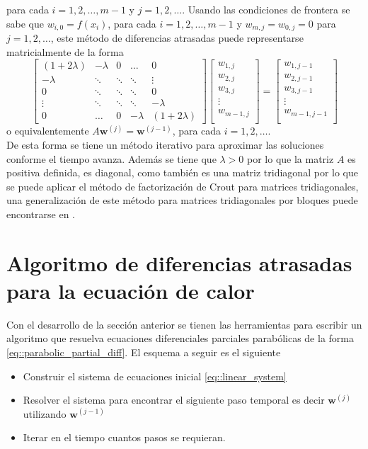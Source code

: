 \documentclass[a4paper]{article}
\begin{document}
para cada $i=1,2,\hdots,m-1$ y $j=1,2,\hdots$. Usando las condiciones de frontera se sabe que $w_{i,0}=f(x_i)$, para cada  
$i=1,2,\hdots,m-1$ y $w_{m,j}=w_{0,j}=0$ para $j=1,2,\hdots$, este método de diferencias atrasadas puede representarse matricialmente de la forma
\begin{equation}\label{eq::linear_system}
\begin{bmatrix}
(1+2\lambda) & -\lambda & 0 &\dots&0 \\
-\lambda     &\ddots    & \ddots& \ddots&\vdots\\
0&\ddots&\ddots&\ddots&0\\
\vdots&\ddots&\ddots&\ddots&-\lambda\\
0&\dots&0&-\lambda&(1+2\lambda)
\end{bmatrix}
\begin{bmatrix}
w_{1,j}\\
w_{2,j}\\
w_{3,j}\\
\vdots\\
w_{m-1,j}\\
\end{bmatrix}=
\begin{bmatrix}
w_{1,j-1}\\
w_{2,j-1}\\
w_{3,j-1}\\
\vdots\\
w_{m-1,j-1}\\
\end{bmatrix}
\end{equation}
o equivalentemente $A\mathbf{w}^{(j)}=\mathbf{w}^{(j-1)}$, para cada $i=1,2,\hdots$.\\
De esta forma se tiene un método iterativo para aproximar las soluciones conforme el tiempo avanza. Además se tiene que $\lambda>0$ por lo que la matriz $A$ es positiva definida, es diagonal, como también es una matriz tridiagonal por lo que se puede aplicar el método de factorización de Crout para matrices tridiagonales, una generalización de este método para matrices tridiagonales por bloques puede encontrarse en \cite{Medina}.

\section{Algoritmo de diferencias atrasadas para la ecuación de calor}
Con el desarrollo de la sección anterior se tienen las herramientas para escribir un algoritmo que resuelva ecuaciones diferenciales parciales parabólicas de la forma \ref{eq::parabolic_partial_diff}. El esquema a seguir es el siguiente
\begin{itemize}
\item Construir el sistema de ecuaciones inicial \ref{eq::linear_system}
\item Resolver el sistema para encontrar el siguiente paso temporal es decir $\mathbf{w}^{(j)}$ utilizando $\mathbf{w}^{(j-1)}$
\item Iterar en el tiempo cuantos pasos se requieran.
\end{itemize}
\end{document}
